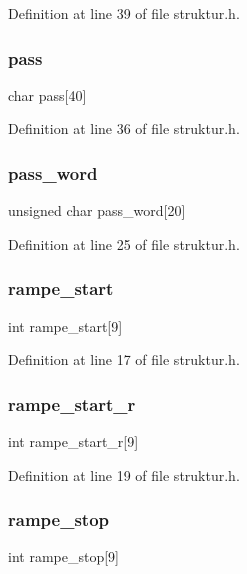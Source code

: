 Definition at line 39 of file struktur.\+h.

\mbox{\label{structramp1_af0ce86e10ecbae36a5eed1e2ad987938}} 
\subsubsection{pass}
{\footnotesize\ttfamily char pass[40]}



Definition at line 36 of file struktur.\+h.

\mbox{\label{structramp1_ada21b3943eb04f05b8460ae8abd1aad7}} 
\subsubsection{pass\+\_\+word}
{\footnotesize\ttfamily unsigned char pass\+\_\+word[20]}



Definition at line 25 of file struktur.\+h.

\mbox{\label{structramp1_aaf8f50c058294afa2574047eba7866c1}} 
\subsubsection{rampe\+\_\+start}
{\footnotesize\ttfamily int rampe\+\_\+start[9]}



Definition at line 17 of file struktur.\+h.

\mbox{\label{structramp1_a32d4e9c586ecfe4f48157c5fb04cd1c2}} 
\subsubsection{rampe\+\_\+start\+\_\+r}
{\footnotesize\ttfamily int rampe\+\_\+start\+\_\+r[9]}



Definition at line 19 of file struktur.\+h.

\mbox{\label{structramp1_ae09c598d28fea9b616fd259e21cdde15}} 
\subsubsection{rampe\+\_\+stop}
{\footnotesize\ttfamily int rampe\+\_\+stop[9]}



